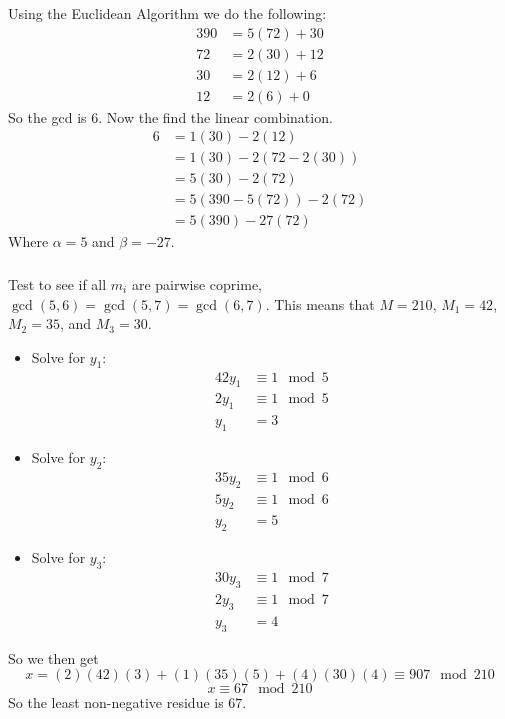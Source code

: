 \documentclass[class=article, crop=false]{standalone}
\begin{document}
\subsubsection{}
Using the Euclidean Algorithm we do the following:
	\begin{align*}
		390 &= 5(72) + 30 \\
		72 &= 2(30) + 12 \\
		30 &= 2(12) + 6 \\
		12 &= 2(6) + 0
	\end{align*}
	So the gcd is $6$. Now the find the linear combination.
	\begin{align*}
		6 &= 1(30) - 2(12) \\
		&= 1(30) - 2(72 - 2(30)) \\
		&= 5(30) - 2(72) \\
		&= 5(390 - 5(72)) - 2(72) \\
		&= 5(390) - 27(72)
	\end{align*}
	Where $\alpha = 5$ and $\beta = -27$.

\subsubsection{}
Test to see if all $m_i$ are pairwise coprime, $\gcd(5,6)=\gcd(5,7)=\gcd(6,7)$. This means that
	$M=210$, $M_1=42$, $M_2=35$, and $M_3=30$.
	\begin{itemize}
		\item[] Solve for $y_1$:
			\begin{align*}
				42y_1 &\equiv 1\mod 5 \\
				2y_1 &\equiv 1\mod 5 \\
				y_1 &= 3
			\end{align*}
		
		\item[] Solve for $y_2$:
			\begin{align*}
				35y_2 &\equiv 1\mod 6 \\
				5y_2 &\equiv 1\mod 6 \\
				y_2 &= 5
			\end{align*}
		
		\item[] Solve for $y_3$:
			\begin{align*}
				30y_3 &\equiv 1\mod 7 \\
				2y_3 &\equiv 1\mod 7 \\
				y_3 &= 4
			\end{align*}
	\end{itemize}
	So we then get
	$$x = (2)(42)(3) + (1)(35)(5) + (4)(30)(4) \equiv 907\mod 210$$
	$$x\equiv 67\mod 210$$
	So the least non-negative residue is $67$.
\end{document}
